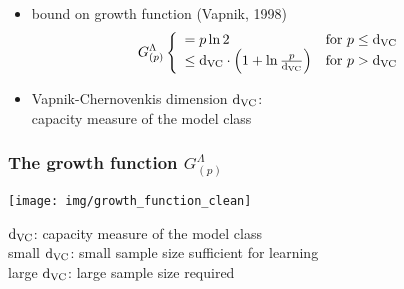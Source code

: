 \begin{frame}
	\begin{itemize}
		\item bound on growth function (Vapnik, 1998)
			\begin{equation}
				G_{(p)}^\Lambda
				\left \{ \begin{array}{ll}
					= p \ln 2 
					& \text{for } p \leq \mathrm{d}_{\mathrm{VC}} \\
					\leq \mathrm{d}_{\mathrm{VC}} \cdot \Big( 1 + \ln \frac{p}{\mathrm{d}_{\mathrm{VC}}} \Big) 
					& \text{for } p > \mathrm{d}_{\mathrm{VC}}
				\end{array} \right.
			\label{eq:growthpiecewise}
			\end{equation}

		\item Vapnik-Chernovenkis dimension $\mathrm{d}_{\mathrm{VC}}$: \\
			capacity measure of the model class
	\end{itemize}
\end{frame}

\begin{frame}\frametitle{The growth function $G_{(p)}^\Lambda$}
	\begin{center}
		\texttt{[image: img/growth\_function\_clean]}
	\end{center}
	\vspace{-2mm}
	$\mathrm{d}_{\mathrm{VC}}$: capacity measure of the model class\\
	small $\mathrm{d}_{\mathrm{VC}}$: small sample size sufficient for learning\\
	large $\mathrm{d}_{\mathrm{VC}}$: large sample size required

\end{frame}



